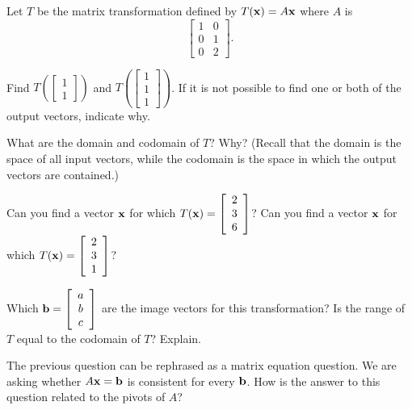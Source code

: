 \begin{activity} \label{act:1_g_4} Let $T$ be the matrix transformation defined by $T(\mathbf{x}) = A\mathbf{x}$ where $A$ is 
\[\left[ \begin{array}{rc} 1&0 \\ 0&1 \\ 0&2 \end{array} \right].\] 
\ba
\item Find $T\left(\left[\begin{array}{c} 1\\1\end{array}\right]\right)$ and $T\left(\left[\begin{array}{c} 1\\1\\1\end{array}\right]\right)$. If it is not possible to find one or both of the output vectors, indicate why.


\item What are the domain and codomain of $T$? Why? (Recall that the domain is the space of all input vectors, while the codomain is the space in which the output vectors are contained.)

\item Can you find a vector $\mathbf{x}$ for which $T(\mathbf{x})= \left[\begin{array}{c} 2\\3\\6\end{array}\right]$? Can you find a vector $\mathbf{x}$ for which $T(\mathbf{x})=\left[\begin{array}{c} 2\\3\\1\end{array}\right]$?

\item Which $\mathbf{b}=\left[\begin{array}{c} a\\b\\c\end{array}\right]$ are the image vectors for this transformation? Is the range of $T$ equal to the codomain of $T$? Explain. 
 
\item The previous question can be rephrased as a matrix equation question.  We are asking whether $A \mathbf{x} = \mathbf{b}$ is consistent for every $\mathbf{b}$. How is the answer to this question related to the pivots of $A$? 

\ea

\end{activity}


